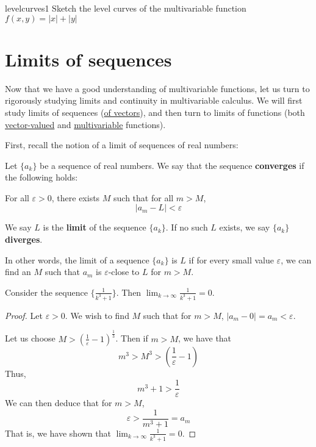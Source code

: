 \begin{problem}{levelcurves1}
Sketch the level curves of the multivariable function $f(x,y) = |x| + |y|$
\end{problem}




\section{Limits of sequences}\label{sec:limits}

Now that we have a good understanding of multivariable functions, let us turn to rigorously studying limits and continuity in multivariable calculus.  We will first study limits of sequences (\hyperref[limseq]{of vectors}), and then turn to limits of functions (both \hyperref[limvectorval]{vector-valued} and \hyperref[limmulti]{multivariable} functions).

First, recall the notion of a limit of sequences of real numbers:

\begin{definition}
Let $\{a_k\}$ be a sequence of real numbers.  We say that the sequence \textbf{converges} if the following holds:

For all $\varepsilon>0$, there exists $M$ such that for all $m > M$, $$|a_m - L | < \varepsilon$$
    
We say $L$ is the \textbf{limit} of the sequence $\{a_k\}$.  If no such $L$ exists, we say $\{a_k\}$ \textbf{diverges}.
\end{definition}

In other words, the limit of a sequence $\{a_k\}$ is $L$ if for every small value $\varepsilon$, we can find an $M$ such that $a_m$ is $\varepsilon$-close to $L$ for $m > M$.



\begin{example}
Consider the sequence $\{\frac{1}{k^3 + 1}\}$.  Then $\lim_{k \to \infty} \frac{1}{k^3 + 1} = 0$.

\begin{proof}
Let $\varepsilon > 0$.  We wish to find $M$ such that for $m > M$, $|a_m - 0|  = a_m < \varepsilon$.

Let us choose $M > (\frac{1}{\varepsilon}-1)^{\frac{1}{3}}$.  Then if $m > M$, we have that $$m^3 > M^3 >  (\frac{1}{\varepsilon}-1)$$
Thus, $$m^3 +1  > \frac{1}{\varepsilon}$$
We can then deduce that for $m > M$,  $$\varepsilon > \frac{1}{m^3 +1} =a_m$$
That is, we have shown that $\lim_{k \to \infty} \frac{1}{k^3 + 1} = 0$.


\end{proof}

\end{example}





